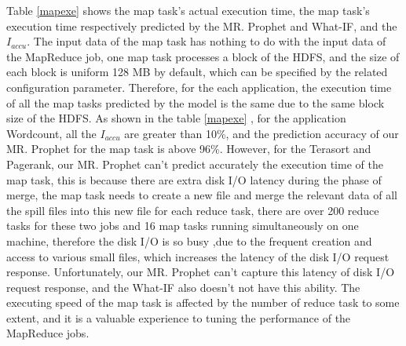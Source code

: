 Table \ref{mapexe} shows the map task's actual execution time, the map task's execution time respectively predicted by the MR. Prophet and What-IF, and the $I_{accu}$. The input data of the map task has nothing to do with the input data of the MapReduce job, one map task processes a block of the HDFS, and the size of each block is uniform 128 MB by default, which can be specified by the related configuration parameter. Therefore, for the each application, the execution time of all the map tasks predicted by the model is the same due to the same block size of the HDFS. As shown in the table \ref{mapexe} , for the application Wordcount, all the $I_{accu}$ are greater than 10\%, and the prediction accuracy of our MR. Prophet for the map task is above 96\%. However, for the Terasort and Pagerank, our MR. Prophet can't predict accurately the execution time of the map task, this is because there are extra disk I/O latency during the phase of merge, the map task needs to create a new file and merge the relevant data of all the spill files into this new file for each reduce task, there are over 200 reduce tasks for these two jobs and 16 map tasks running simultaneously on one machine, therefore the disk I/O is so busy ,due to the frequent creation and access to various small files, which increases the latency of the disk I/O request response. Unfortunately, our MR. Prophet can't capture this latency of disk I/O request response, and the What-IF also doesn't not have this ability. The executing speed of the map task is affected by the number of reduce task to some extent, and it is a valuable experience to tuning the performance of the MapReduce jobs.

